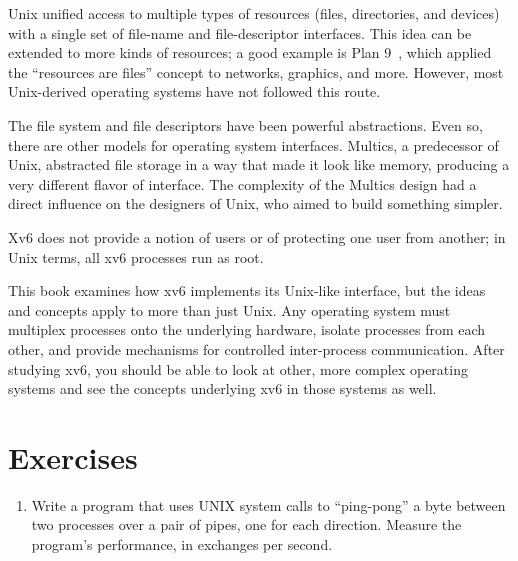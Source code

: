 Unix unified access to multiple types of resources (files,
directories, and devices) with a single set of
file-name and file-descriptor interfaces.
This idea can be extended to more kinds of resources;
a good example is Plan 9~\cite{Presotto91plan9},
which applied the ``resources are files''
concept to
networks, graphics, and more.
However, most Unix-derived operating systems have
not followed this route.

The file system and file descriptors have been  powerful
abstractions.
Even so, there are other models for operating system interfaces.
Multics, a predecessor of Unix,
abstracted file storage in a way that made it look like memory,
producing a very different flavor of interface.
The complexity of the Multics design had a direct influence
on the designers of Unix, who aimed to build something simpler.

Xv6 does not provide a notion of users or of protecting
one user from another; in Unix terms, all xv6 processes
run as root.

This book examines how xv6 implements its Unix-like interface,
but the ideas and concepts apply to more than just Unix.
Any operating system must multiplex processes onto
the underlying hardware, isolate processes from each
other, and provide mechanisms for controlled
inter-process communication.
After studying xv6, you should be able to
look at other, more complex operating systems
and see the concepts underlying xv6 in those systems as well.

\section{Exercises}

\begin{enumerate}

\item Write a program that uses UNIX system calls to
``ping-pong'' a byte between two processes over a pair
of pipes, one for each direction. Measure the
program's performance, in exchanges per second.

\end{enumerate}
